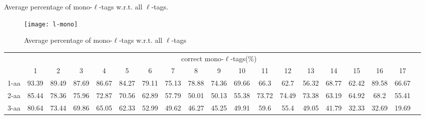\documentclass{article}[12pt]
\begin{document}
\begin{landscape}
\begin{table}[h]
\caption{ Average percentage of mono-$\ell$-tags w.r.t. all $\ell$-tags.}
\label{table:l-mono}

\vspace{3mm}
\end{table}
\end{landscape}

\begin{figure}
  \begin{center}
\texttt{[image: l-mono]}
\end{center}
\caption{Average percentage of mono-$\ell$-tags w.r.t. all $\ell$-tags}
  \label{fig:l-mono}
\end{figure}


\begin{landscape}

\begin{table}[h]\tiny
\vspace{3mm}
{\centering
\begin{center}
\begin{tabular}{|l|c|c|c|c|c|c|c|c|c|c|c|c|c|c|c|c|c|c|}
  \hline
  & \multicolumn{ 17 }{|c|}{correct mono-$\ell$-tags(\%)} \\
  \cline{2- 18}
    & 1 & 2 & 3 & 4 & 5 & 6 & 7 & 8 & 9 & 10 & 11 & 12 & 13 & 14 & 15 & 16 & 17\\
  \hline
1-aa  & 93.39 & 89.49 & 87.69 & 86.67 & 84.27 & 79.11 & 75.13 & 78.88 & 74.36 & 69.66 & 66.3 & 62.7 & 56.32 & 68.77 & 62.42 & 89.58 & 66.67\\
2-aa  & 85.44 & 78.36 & 75.96 & 72.87 & 70.56 & 62.89 & 57.79 & 50.01 & 50.13 & 55.38 & 73.72 & 74.49 & 73.38 & 63.19 & 64.92 & 68.2 & 55.41\\
3-aa  & 80.64 & 73.44 & 69.86 & 65.05 & 62.33 & 52.99 & 49.62 & 46.27 & 45.25 & 49.91 & 59.6 & 55.4 & 49.05 & 41.79 & 32.33 & 32.69 & 19.69\\
 \hline
\end{tabular}
\end{center}
\par}
\centering


\end{table}
\end{landscape}
\end{document}
